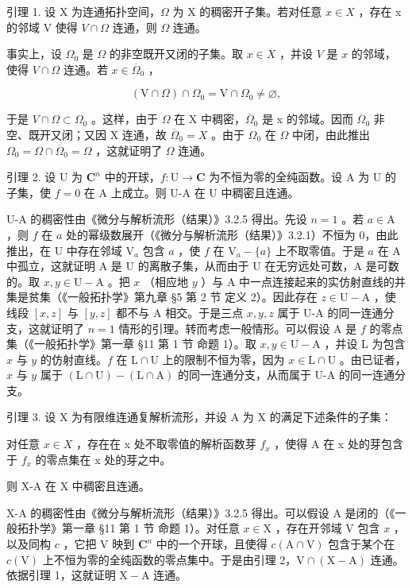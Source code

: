 
引理 1. 设 X 为连通拓扑空间，\(\Omega\) 为 X 的稠密开子集。若对任意 \(x \in X\) ，存在 x 的邻域 V 使得 \(V \cap \Omega\) 连通，则 \(\Omega\) 连通。

事实上，设 \(\Omega_0\) 是 \(\Omega\) 的非空既开又闭的子集。取 \(x \in X\) ，并设 \(V\) 是 \(x\) 的邻域，使得 \(V \cap \Omega\) 连通。若 \(x \in \overline{\Omega}_0\) ，

\[
(\mathrm{V} \cap \Omega) \cap \Omega_ {0} = \mathrm{V} \cap \Omega_ {0} \neq \varnothing ,
\]

于是 \(V \cap \Omega \subset \Omega_{0}\) 。这样，由于 \(\Omega\) 在 X 中稠密，\(\overline{\Omega}_{0}\) 是 x 的邻域。因而 \(\overline{\Omega}_{0}\) 非空、既开又闭；又因 X 连通，故 \(\overline{\Omega}_{0} = X\) 。由于 \(\Omega_{0}\) 在 \(\Omega\) 中闭，由此推出 \(\Omega_{0} = \Omega \cap \overline{\Omega}_{0} = \Omega\) ，这就证明了 \(\Omega\) 连通。

引理 2. 设 U 为 \(\mathbf{C}^n\) 中的开球，\(f: \mathrm{U} \to \mathbf{C}\) 为不恒为零的全纯函数。设 A 为 U 的子集，使 \(f = 0\) 在 A 上成立。则 U-A 在 U 中稠密且连通。

U-A 的稠密性由《微分与解析流形（结果）》3.2.5 得出。先设 \(n = 1\) 。若 \(a \in \mathrm{A}\) ，则 \(f\) 在 \(a\) 处的幂级数展开（《微分与解析流形（结果）》3.2.1）不恒为 0，由此推出，在 U 中存在邻域 \(\mathrm{V}_a\) 包含 \(a\) ，使 \(f\) 在 \(\mathrm{V}_a - \{a\}\) 上不取零值。于是 \(a\) 在 A 中孤立，这就证明 A 是 U 的离散子集，从而由于 U 在无穷远处可数，A 是可数的。取 \(x, y \in \mathrm{U} - \mathrm{A}\) 。把 \(x\) （相应地 \(y\) ）与 A 中一点连接起来的实仿射直线的并集是贫集（《一般拓扑学》第九章 §5 第 2 节 定义 2）。因此存在 \(z \in \mathrm{U} - \mathrm{A}\) ，使线段 \([x, z]\) 与 \([y, z]\) 都不与 A 相交。于是三点 \(x, y, z\) 属于 U-A 的同一连通分支，这就证明了 \(n = 1\) 情形的引理。转而考虑一般情形。可以假设 A 是 \(f\) 的零点集（《一般拓扑学》第一章 §11 第 1 节 命题 1）。取 \(x, y \in \mathrm{U} - \mathrm{A}\) ，并设 L 为包含 \(x\) 与 \(y\) 的仿射直线。\(f\) 在 \(\mathrm{L} \cap \mathrm{U}\) 上的限制不恒为零，因为 \(x \in \mathrm{L} \cap \mathrm{U}\) 。由已证者，\(x\) 与 \(y\) 属于 \((\mathrm{L} \cap \mathrm{U}) - (\mathrm{L} \cap \mathrm{A})\) 的同一连通分支，从而属于 U-A 的同一连通分支。

引理 3. 设 X 为有限维连通复解析流形，并设 A 为 X 的满足下述条件的子集：

对任意 \(x \in X\) ，存在在 x 处不取零值的解析函数芽 \(f_{x}\) ，使得 A 在 x 处的芽包含于 \(f_{x}\) 的零点集在 x 处的芽之中。

则 X-A 在 X 中稠密且连通。

X-A 的稠密性由《微分与解析流形（结果）》3.2.5 得出。可以假设 A 是闭的（《一般拓扑学》第一章 §11 第 1 节 命题 1）。对任意 \(x \in \mathrm{X}\) ，存在开邻域 \(\mathrm{V}\) 包含 \(x\) ，以及同构 \(c\) ，它把 \(\mathrm{V}\) 映到 \(\mathbf{C}^n\) 中的一个开球，且使得 \(c(\mathrm{A} \cap \mathrm{V})\) 包含于某个在 \(c(\mathrm{V})\) 上不恒为零的全纯函数的零点集中。于是由引理 2，\(\mathrm{V} \cap (\mathrm{X} - \mathrm{A})\) 连通。依据引理 1，这就证明 \(\mathrm{X} - \mathrm{A}\) 连通。

